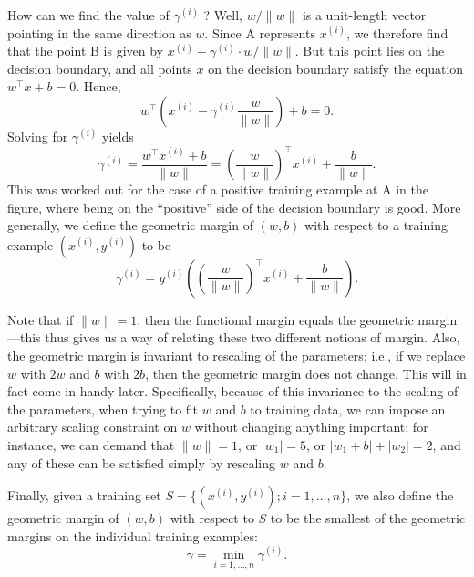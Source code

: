 How can we find the value of $\gamma^{(i)}$ ? Well, $w/\lVert w \lVert$ is a unit-length vector
pointing in the same direction as $w$. Since A represents $x^{(i)}$, we therefore
find that the point B is given by $x^{(i)} - \gamma^{(i)} \cdot w/\lVert w \rVert$. But this point lies on
the decision boundary, and all points $x$ on the decision boundary satisfy the
equation $w^\top x + b = 0$. Hence,
\begin{equation*}
    w^\top \left(x^{(i)} - \gamma^{(i)} \frac{w}{\lVert w \rVert} \right) + b = 0.    
\end{equation*}
Solving for $\gamma^{(i)}$ yields
\begin{equation*}
    \gamma^{(i)} = \frac{w^\top x^{(i)} + b}{\lVert w \rVert} = \left( \frac{w}{\lVert w \rVert} \right)^\top x^{(i)} + \frac{b}{\lVert w \rVert}.
\end{equation*}
This was worked out for the case of a positive training example at A in the
figure, where being on the ``positive'' side of the decision boundary is good.
More generally, we define the geometric margin of $(w,b)$ with respect to a
training example $(x^{(i)} ,y^{(i)} )$ to be
\begin{equation*}
    \gamma^{(i)} = y^{(i)} \left(\left( \frac{w}{\lVert w \rVert}\right)^\top x^{(i)} + \frac{b}{\lVert w \rVert}\right).
\end{equation*}

Note that if $\lVert w \rVert = 1$, then the functional margin equals the geometric
margin---this thus gives us a way of relating these two different notions of
margin. Also, the geometric margin is invariant to rescaling of the parameters;
i.e., if we replace $w$ with $2w$ and $b$ with $2b$, then the geometric margin
does not change. This will in fact come in handy later. Specifically, because
of this invariance to the scaling of the parameters, when trying to fit $w$ and $b$
to training data, we can impose an arbitrary scaling constraint on $w$ without
changing anything important; for instance, we can demand that $\lVert w \rVert = 1$, or
$|w_1| = 5$, or $|w_1 + b| + |w_2| = 2$, and any of these can be satisfied simply by
rescaling $w$ and $b$.

Finally, given a training set $S = \{(x^{(i)} ,y^{(i)} );i = 1,\ldots ,n\}$, we also define
the geometric margin of $(w,b)$ with respect to $S$ to be the smallest of the
geometric margins on the individual training examples:
\begin{equation*}
    \gamma = \min_{i=1,\ldots ,n} \gamma^{(i)}.
\end{equation*}

